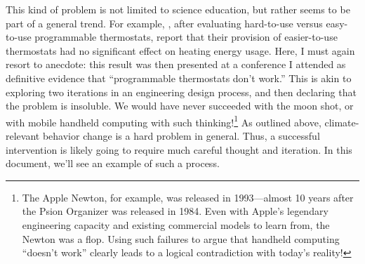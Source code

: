 This kind of problem is not limited to science education, but rather seems to be
part of a general trend. For example, \textcite{sachs_field_2012}, after evaluating
hard-to-use versus easy-to-use programmable thermostats, report that their
provision of easier-to-use thermostats had no significant effect on heating
energy usage. Here, I must again resort to anecdote: this result was then
presented at a conference I attended as definitive evidence that “programmable
thermostats don't work.” 
This is akin to exploring two iterations in an
engineering design process, and then declaring that the problem is insoluble. We
would have never succeeded with the moon shot, or with mobile handheld computing
with such thinking!\footnote{The Apple Newton, for example, was released in
    1993---almost 10 years after the Psion Organizer was released in 1984. Even
    with Apple's legendary engineering capacity and existing commercial models
    to learn from, the Newton was a flop. Using such failures to argue that
    handheld computing “doesn't work” clearly leads to a logical contradiction
    with today's reality!}
As outlined above, climate-relevant behavior change is a hard problem in
general.  Thus, a successful intervention is likely going to require much
careful thought and iteration. In this document, we'll see an example of such a
process.



